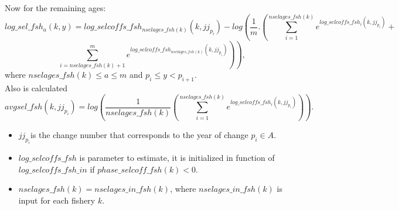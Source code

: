 \documentclass{article}
\begin{document}
\begin{itemize}
  Now for the remaining ages:
    \begin{equation}
         log\_sel\_fsh_a(k,y)=log\_selcoffs\_fsh_{nselages\_fsh(k)}(k,jj_{p_i})-log\left(\dfrac{1}{m}.\left(\sum_{i=1}^{nselages\_fsh(k)}e^{log\_selcoffs\_fsh_i(k,jj_{p_i})}+\right.\right.
    \end{equation}
 \begin{equation*}
       \left. \left.\sum_{i=nselages\_fsh(k)+1}^{m}e^{log\_selcoffs\_fsh_{nselages\_fsh(k)}(k,jj_{p_i})}\right)\right), 
    \end{equation*}
    where $nselages\_fsh(k)\leq a \leq m$ and $p_i\leq y < p_{i+1}$.\\
    Also is calculated
    \begin{equation}
        avgsel\_fsh(k,jj_{p_i})=log\left(\dfrac{1}{nselages\_fsh(k)}\left( \sum_{i=1}^{nselages\_fsh(k)}e^{log\_selcoffs\_fsh_i(k,jj_{p_i})}\right)\right).
    \end{equation}
    
    
    \begin{itemize}
        \item $jj_{p_i}$is the change number that corresponds to the year of change $p_i\in A$.
        \item $log\_selcoffs\_fsh$ is parameter to estimate, it is initialized in function of  $log\_selcoffs\_fsh\_in$ if $phase\_selcoff\_fsh(k)<0$. %
        \item $nselages\_fsh(k)=nselages\_in\_fsh(k)$, where $nselages\_in\_fsh(k)$ is input for each fishery $k$.
    \end{itemize}














    
   

\end{itemize}
\end{document}

